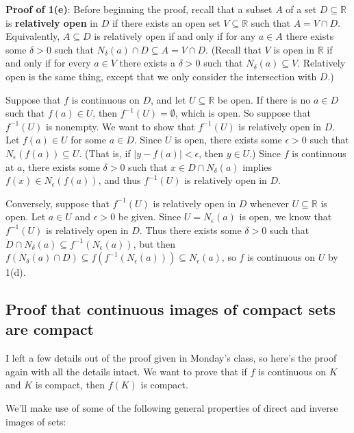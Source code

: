 \documentclass[letterpaper,12pt]{article}
\newcommand{\R}{\mathbb{R}}
\newcommand{\abs}[1]{\lvert #1\rvert}
\begin{document}
\bigskip

{\bf Proof of 1(e)}: Before beginning the proof, recall that a subset $A$ of a set $D\subseteq \R$ is {\bf relatively open} in $D$ if there exists an open set $V\subseteq \R$ such that $A=V\cap D$. Equivalently, $A\subseteq D$ is relatively open if and only if for any $a\in A$ there exists some $\delta >0$ such that $N_\delta(a)\cap D\subseteq A= V\cap D$. (Recall that $V$ is open in $\R$ if and only if for every $a\in V$ there exists a $\delta>0$ such that $N_\delta(a)\subseteq V$. Relatively open is the same thing, except that we only consider the intersection with $D$.)

\bigskip

Suppose that $f$ is continuous on $D$, and let $U\subseteq \R$ be open. If there is no $a\in D$ such that $f(a)\in U$, then $f^{-1}(U)=\emptyset$, which is open. So suppose that $f^{-1}(U)$ is nonempty. We want to show that $f^{-1}(U)$ is relatively open in $D$. Let $f(a)\in U$ for some $a\in D$. Since $U$ is open, there exists some $\epsilon>0$ such that $N_\epsilon(f(a))\subseteq U$. (That is, if $\abs{y-f(a)}<\epsilon$, then $y\in U$.) Since $f$ is continuous at $a$, there exists some $\delta>0$ such that $x\in D\cap N_\delta(a)$ implies $f(x)\in N_\epsilon(f(a))$, and thus $f^{-1}(U)$ is relatively open in $D$.

Conversely, suppose that $f^{-1}(U)$ is relatively open in $D$ whenever $U\subseteq \R$ is open. Let $a\in U$ and $\epsilon>0$ be given. Since $U=N_\epsilon(a)$ is open, we know that $f^{-1}(U)$ is relatively open in $D$. Thus there exists some $\delta>0$ such that $D\cap N_\delta(a)\subseteq f^{-1}(N_\epsilon(a))$, but then $f(N_\delta(a)\cap D)\subseteq f(f^{-1}(N_\epsilon(a)))\subseteq N_\epsilon(a)$, so $f$ is continuous on $U$ by 1(d).

\newpage

\subsection*{Proof that continuous images of compact sets are compact}
I left a few details out of the proof given in Monday's class, so here's the proof again with all the details intact. We want to prove that if $f$ is continuous on $K$ and $K$ is compact, then $f(K)$ is compact.

We'll make use of some of the following general properties of direct and inverse images of sets:
\end{document}
